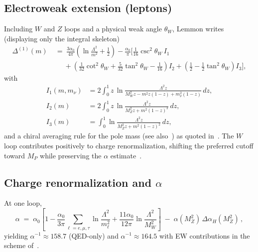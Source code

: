 \documentclass[11pt]{article}
\begin{document}
      \subsection{Electroweak extension (leptons)}
          Including $W$ and $Z$ loops and a physical weak angle $\theta_W$, Lemmon writes (displaying only the integral skeleton)
          \begin{align}
          \Delta^{(1)}(m)\;&=\;\frac{3\alpha_0}{4\pi}\!\left(\ln\frac{\Lambda^2}{m^2}+\frac12\right)
          -\frac{\alpha_0}{\pi}\Bigg[\frac{1}{16}\csc^2\!\theta_W\,I_1 \nonumber\\
          &\quad\;+\left(\frac{1}{32}\cot^2\!\theta_W+\frac{5}{32}\tan^2\!\theta_W-\frac{1}{16}\right)I_2
          +\left(\frac12-\frac12\tan^2\!\theta_W\right)I_3\Bigg],
          \label{eq:N3}
          \end{align}
          with
          \begin{align}
          I_1(m,m_\nu)&=2\!\int_0^1\! z\,\ln\frac{\Lambda^2 z}{M_W^2 z-m^2z(1-z)+m_\nu^2(1-z)}\,dz,\nonumber\\
          I_2(m)&=2\!\int_0^1\! z\,\ln\frac{\Lambda^2 z}{M_Z^2 z+m^2(1-z)^2}\,dz,\nonumber\\
          I_3(m)&=\int_0^1\!\ln\frac{\Lambda^2 z}{M_Z^2 z+m^2(1-z)^2}\,dz,
          \label{eq:N4}
          \end{align}
          and a chiral averaging rule for the pole mass (see also~\cite{KniehlSirlin2008PoleMass}) as quoted in~\cite{Lemmon2013FamiliesAlpha}. The $W$ loop contributes positively to charge renormalization, shifting the preferred cutoff toward $M_P$ while preserving the $\alpha$ estimate~\cite{Lemmon2013FamiliesAlpha}.

      \subsection{Charge renormalization and $\alpha$}
          At one loop,
          \begin{equation}
          \alpha \;=\;\alpha_0\!\left[1-\frac{\alpha_0}{3\pi}\sum_{\ell=e,\mu,\tau}\ln\frac{\Lambda^2}{m_\ell^2}
                                    +\frac{11\alpha_0}{12\pi}\ln\frac{\Lambda^2}{M_W^2}\right]
          \;-\;\alpha(M_Z^2)\,\Delta\alpha_H(M_Z^2)\,,
          \label{eq:N5}
          \end{equation}
          yielding $\alpha^{-1}\!\approx\!158.7$ (QED-only) and $\alpha^{-1}\!\approx\!164.5$ with EW contributions in the scheme of~\cite{Lemmon2013FamiliesAlpha}.
\end{document}
